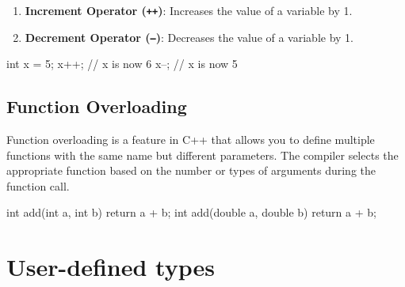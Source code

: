 \begin{enumerate}
    \item \textbf{Increment Operator (\texttt{++})}: Increases the value of a variable by 1.
    \item \textbf{Decrement Operator (\texttt{--})}: Decreases the value of a variable by 1.
\end{enumerate}

\begin{exampleblock}
\begin{codeblock}[language=C++]
int x = 5;
x++; // x is now 6
x--; // x is now 5
\end{codeblock}
\end{exampleblock}

\subsection{Function Overloading}
Function overloading is a feature in C++ that allows you to define multiple functions with the
same name but different parameters. The compiler selects the appropriate function based on the number or types of arguments
during the function call.

\begin{exampleblock}
\begin{codeblock}[language=C++]
int add(int a, int b) {
    return a + b;
}
int add(double a, double b) {
    return a + b;
}
\end{codeblock}
\end{exampleblock}



\newpage
\section{User-defined types}

